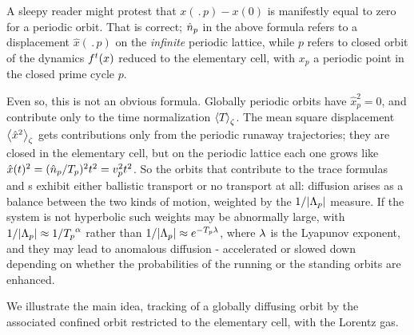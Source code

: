 A sleepy reader might protest that
$x(\period{p})-x(0)$ is manifestly equal to zero for
a periodic orbit. That is correct; $\hat n_p$ in the
above formula refers to a displacement $\hat{x}(\period{p})$
on the {\em infinite} periodic
lattice, while $p$ refers to closed orbit of the dynamics
${f^{t}(x)}$ reduced to the
elementary cell, with $x_p$ a periodic point in the closed prime
cycle $p$.

Even so, this is not an obvious formula. Globally periodic
orbits have $\hat{x}_p^2 =0$, and contribute only to the
time normalization $\left\langle {{\ensuremath{T_{}}}} \right\rangle_\zeta$. The mean square displacement
$\left\langle {\hat{x}^2} \right\rangle_\zeta$ gets contributions only from the
periodic runaway trajectories; they are closed in the
elementary cell, but on the periodic lattice each one grows like
$\hat{x}(t)^2 = (\hat n_{p}/{T_{p}})^2 t^2 = v^2_p t^2$.
So the orbits that contribute to the trace formulas and
\Fd s exhibit either ballistic
transport or no transport at all: diffusion arises as a balance
between the two kinds of motion,
weighted by the $1/|\Lambda_p|$ measure. If the system is not
hyperbolic such weights may be abnormally large, with $1/|\Lambda_p|
\approx 1/{T_{p}}^\alpha$ rather than
$1/|\Lambda_p| \approx e^{-{T_{p}}\lambda}$, where $\lambda$ is the Lyapunov
exponent, and they may lead to anomalous diffusion - accelerated or
slowed down depending on whether the probabilities of the running or the
standing orbits are enhanced.

We illustrate the main idea, tracking of a globally diffusing
orbit by the associated confined orbit restricted to the
elementary cell, with the Lorentz gas.


